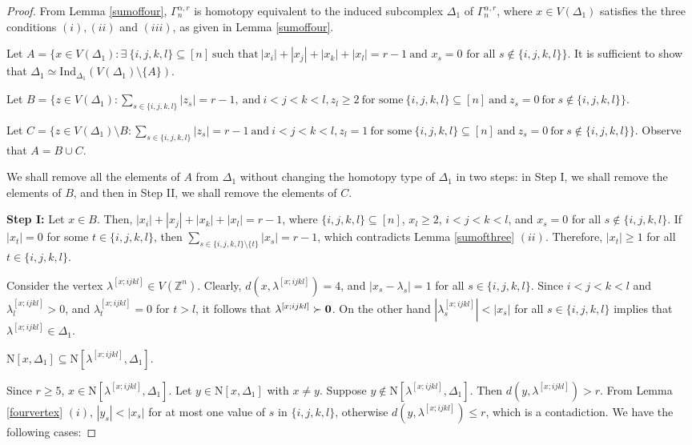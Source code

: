 \documentclass[10pt,a4paper]{amsart}
\def\Z{{\mathbb{Z}}}
\def\n{{\mathrm{N}}}
\newcommand{\D}{\Delta}
\begin{document}
\begin{proof}
	From Lemma \ref{sumoffour},  $\Gamma_n^{\alpha, r}$ is homotopy equivalent to the induced subcomplex $\Delta_1$ of $\Gamma_n^{\alpha, r}$, where $x \in V(\Delta_1)$ satisfies the three conditions $(i), (ii)$ and $(iii)$, as given in Lemma \ref{sumoffour}. 
	
	Let $A = \{x \in V(\Delta_1) : \exists \ \{i, j, k, l\} \subseteq [n] \ \text{such that} \  |x_i|+ |x_j|+ |x_k| + |x_l| = r-1 \ \text{and }  x_s = 0  \text{ for all }  s \notin\{i,j,k,l\} \}$. It is sufficient to show that $\D_1\simeq \mathrm{Ind}_{\D_1}(V(\D_1)\setminus \{A\})$. 
	
 Let $B=\{z\in V(\D_1): \sum_{s\in\{i,j,k,l\}}|z_s|=r-1, \ \text{and} \ i<j<k<l, z_l\geq2\ \text{for some} \ \{i,j,k,l\}\subseteq[n] 
	\ \text{and} \  z_s=0 \ \text{for}\ s\notin\{i,j,k,l\} \}$. 
	
	Let $C=\{z\in V(\D_1)\setminus B: \sum_{s\in\{i,j,k,l\}}|z_s|=r-1 \ \text{and}\  i<j<k<l, z_l=1\ \text{for some} \ \{i,j,k,l\}\subseteq[n] 
	\ \text{and} \  z_s=0 \ \text{for}\ s\notin\{i,j,k,l\} \}$.
	Observe that $A=B\cup C$.
	
	We shall remove all the elements of $A$ from $\D_1$ without changing the homotopy type of $\D_1$ in two steps: in Step I, we shall remove the elements of $B$, and then in Step II, we shall remove the elements of $C$.
	
    \smallskip
	\noindent 
	\textbf{Step I:}
	Let $x\in B$. Then, $|x_i|+|x_j|+|x_k|+|x_l|=r-1$, where $\{i,j,k,l\}\subseteq [n]$, $x_l\geq 2$, $i<j<k<l$, and $x_s=0$ for all $s\notin \{i,j,k,l\}$. If $|x_t|=0$ for some $t\in \{i,j,k,l\}$, then $\sum_{s\in\{i,j,k,l\}\setminus\{t\}}|x_s|=r-1$, which contradicts Lemma \ref{sumofthree} $(ii)$. Therefore, $|x_t|\geq 1$ for all $t\in \{i,j,k,l\}$.  
	
	Consider the vertex $\lambda^{[x;ijkl]}\in V(\Z^n)$. Clearly,  $d(x,\lambda^{[x;ijkl]})=4$, and $|x_s-\lambda_s|=1$ for all $s\in\{i,j,k,l\}$. Since $i<j<k<l$ and $\lambda^{[x;ijkl]}_l>0$, and $\lambda^{[x;ijkl]}_t=0$ for $t>l$, it follows that $\lambda^{[x;ijkl]}\succ {\bf{0}}$. On the other hand $|\lambda^{[x;ijkl]}_s|<|x_s|$ for all $s\in \{i,j,k,l\}$ implies that $\lambda^{[x;ijkl]}\in \D_1$. 
	
	\begin{claim}\label{claim:fourvertex}
		$\n[x, \D_1] \subseteq \n[\lambda^{[x;ijkl]}, \D_1]$.
	\end{claim}
	Since $r \geq 5$, $x\in\n[\lambda^{[x;ijkl]}, \D_1]$. Let $y\in\n[x,\D_1]$ with $x\neq y$. Suppose $y\notin \n[\lambda^{[x;ijkl]},\D_1]$.
	Then $d(y,\lambda^{[x;ijkl]})>r$. From Lemma \ref{fourvertex} $(i)$, $|y_s|<|x_s|$ for at most one value of $s$ in $\{i,j,k,l\}$, otherwise $d(y,\lambda^{[x;ijkl]})\leq r$, which is a contadiction. We have the following cases:
	

\end{proof}
\end{document}
